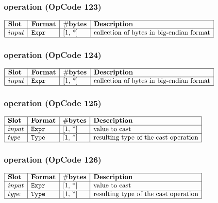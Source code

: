 \subsubsection{ operation (OpCode 123)}

\noindent
\(\begin{array}{| l | l | l | l |}
    \hline
    \bf{Slot} & \bf{Format} & \bf{\#bytes} & \bf{Description} \\
    \hline
         input & \lst{Expr} & \text{[1, *]} & \text{collection of bytes in big-endian format} \\
    \hline
      
\end{array}\)
       

\subsubsection{ operation (OpCode 124)}

\noindent
\(\begin{array}{| l | l | l | l |}
    \hline
    \bf{Slot} & \bf{Format} & \bf{\#bytes} & \bf{Description} \\
    \hline
         input & \lst{Expr} & \text{[1, *]} & \text{collection of bytes in big-endian format} \\
    \hline
      
\end{array}\)
       

\subsubsection{ operation (OpCode 125)}

\noindent
\(\begin{array}{| l | l | l | l |}
    \hline
    \bf{Slot} & \bf{Format} & \bf{\#bytes} & \bf{Description} \\
    \hline
         input & \lst{Expr} & \text{[1, *]} & \text{value to cast} \\
    \hline
           type & \lst{Type} & \text{[1, *]} & \text{resulting type of the cast operation} \\
    \hline
      
\end{array}\)
       

\subsubsection{ operation (OpCode 126)}

\noindent
\(\begin{array}{| l | l | l | l |}
    \hline
    \bf{Slot} & \bf{Format} & \bf{\#bytes} & \bf{Description} \\
    \hline
         input & \lst{Expr} & \text{[1, *]} & \text{value to cast} \\
    \hline
           type & \lst{Type} & \text{[1, *]} & \text{resulting type of the cast operation} \\
    \hline
      
\end{array}\)
       